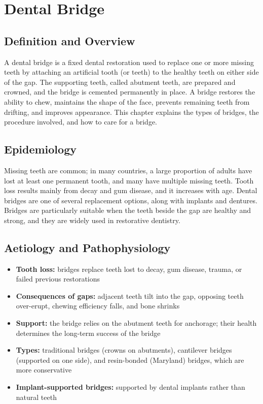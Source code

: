 \chapter{Dental Bridge}

\section*{Definition and Overview}
A dental bridge is a fixed dental restoration used to replace one or more missing teeth by attaching an artificial tooth (or teeth) to the healthy teeth on either side of the gap. The supporting teeth, called abutment teeth, are prepared and crowned, and the bridge is cemented permanently in place. A bridge restores the ability to chew, maintains the shape of the face, prevents remaining teeth from drifting, and improves appearance. This chapter explains the types of bridges, the procedure involved, and how to care for a bridge.

\section*{Epidemiology}
Missing teeth are common; in many countries, a large proportion of adults have lost at least one permanent tooth, and many have multiple missing teeth. Tooth loss results mainly from decay and gum disease, and it increases with age. Dental bridges are one of several replacement options, along with implants and dentures. Bridges are particularly suitable when the teeth beside the gap are healthy and strong, and they are widely used in restorative dentistry.

\section*{Aetiology and Pathophysiology}
\begin{itemize}
    \item \textbf{Tooth loss:} bridges replace teeth lost to decay, gum disease, trauma, or failed previous restorations
    \item \textbf{Consequences of gaps:} adjacent teeth tilt into the gap, opposing teeth over-erupt, chewing efficiency falls, and bone shrinks
    \item \textbf{Support:} the bridge relies on the abutment teeth for anchorage; their health determines the long-term success of the bridge
    \item \textbf{Types:} traditional bridges (crowns on abutments), cantilever bridges (supported on one side), and resin-bonded (Maryland) bridges, which are more conservative
    \item \textbf{Implant-supported bridges:} supported by dental implants rather than natural teeth
\end{itemize}

